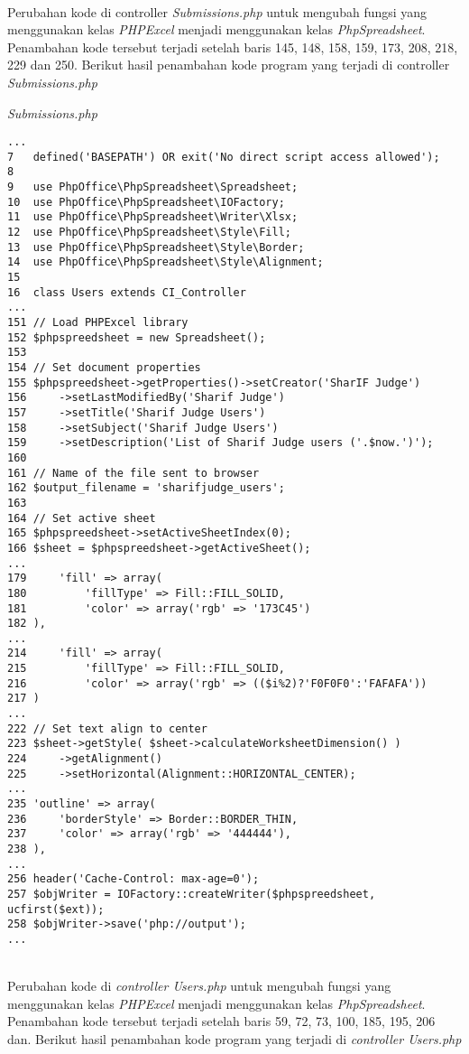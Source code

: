 ~\\
Perubahan kode di controller \textit{Submissions.php} untuk mengubah fungsi yang menggunakan kelas \textit{PHPExcel} menjadi menggunakan kelas \textit{PhpSpreadsheet}. Penambahan kode tersebut terjadi setelah baris 145, 148, 158, 159, 173, 208, 218, 229 dan 250. Berikut hasil penambahan kode program yang terjadi di controller \textit{Submissions.php}

\textit{Submissions.php}
\begin{lstlisting}[basicstyle=\ttfamily, frame=single,
columns=fullflexible, keepspaces=true, breaklines=true]
...
7	defined('BASEPATH') OR exit('No direct script access allowed');
8
9	use PhpOffice\PhpSpreadsheet\Spreadsheet;
10	use PhpOffice\PhpSpreadsheet\IOFactory;
11	use PhpOffice\PhpSpreadsheet\Writer\Xlsx;
12	use PhpOffice\PhpSpreadsheet\Style\Fill;
13	use PhpOffice\PhpSpreadsheet\Style\Border;
14	use PhpOffice\PhpSpreadsheet\Style\Alignment;
15
16	class Users extends CI_Controller
...
151	// Load PHPExcel library
152	$phpspreedsheet = new Spreadsheet();
153	
154	// Set document properties
155	$phpspreedsheet->getProperties()->setCreator('SharIF Judge')
156		->setLastModifiedBy('Sharif Judge')
157		->setTitle('Sharif Judge Users')
158		->setSubject('Sharif Judge Users')
159		->setDescription('List of Sharif Judge users ('.$now.')');
160	
161	// Name of the file sent to browser
162	$output_filename = 'sharifjudge_users';
163	
164	// Set active sheet
165	$phpspreedsheet->setActiveSheetIndex(0);
166	$sheet = $phpspreedsheet->getActiveSheet();
...
179		'fill' => array(
180			'fillType' => Fill::FILL_SOLID,
181			'color' => array('rgb' => '173C45')
182	),
...
214		'fill' => array(
215			'fillType' => Fill::FILL_SOLID,
216			'color' => array('rgb' => (($i%2)?'F0F0F0':'FAFAFA'))
217	)
...
222	// Set text align to center
223	$sheet->getStyle( $sheet->calculateWorksheetDimension() )
224		->getAlignment()
225		->setHorizontal(Alignment::HORIZONTAL_CENTER);
...
235	'outline' => array(
236		'borderStyle' => Border::BORDER_THIN,
237		'color' => array('rgb' => '444444'),
238	),
...
256	header('Cache-Control: max-age=0');
257	$objWriter = IOFactory::createWriter($phpspreedsheet, ucfirst($ext));
258	$objWriter->save('php://output');
...
\end{lstlisting}
~\\
Perubahan kode di \textit{controller Users.php} untuk mengubah fungsi yang menggunakan kelas \textit{PHPExcel} menjadi menggunakan kelas \textit{PhpSpreadsheet}. Penambahan kode tersebut terjadi setelah baris 59, 72, 73, 100, 185, 195, 206 dan. Berikut hasil penambahan kode program yang terjadi di \textit{controller Users.php}

